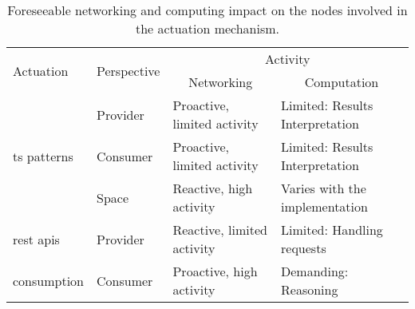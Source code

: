 
\begin{table}[htbp]
  \caption{Foreseeable networking and computing impact on the nodes involved in the actuation mechanism.}
  \begin{center}
    \footnotesize
    \begin{tabular}{llp{4cm}p{4.4cm}}
      \hline
      \multirow{2}{*}{Actuation} &
      \multirow{2}{*}{Perspective} &
      \multicolumn{2}{c}{Activity} \\
      ~ &
      ~ &
      \multicolumn{1}{c}{Networking} &
      \multicolumn{1}{c}{Computation} \\
      \hline
      \multirow{3}{*}{\ac{ts} patterns} & Provider & Proactive, limited activity & Limited: Results Interpretation \\
				    ~ & Consumer & Proactive, limited activity & Limited: Results Interpretation \\
				    ~ & Space & Reactive, high activity & Varies with the implementation \\[0.2cm]
      \ac{rest} \acp{api} & Provider & Reactive, limited activity & Limited: Handling requests \\
        consumption       & Consumer & Proactive, high activity &  Demanding: Reasoning \\ %
      \hline
    \end{tabular}
  \end{center}
  \label{tab:actuation_networking_computing}
\end{table}
